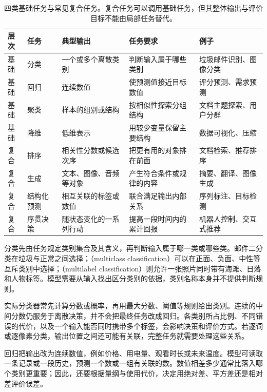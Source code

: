\begin{table}[t]
  \centering
  \small
  \begin{tabularx}{\linewidth}{@{}llXXX@{}}
    \toprule
    \textbf{层次} & \textbf{任务} & \textbf{典型输出} & \textbf{任务要求} & \textbf{例子} \\
    \midrule
    基础 & 分类 & 一个或多个离散类别 & 判断输入属于哪些类别 & 垃圾邮件识别、图像分类 \\
    基础 & 回归 & 连续数值 & 使预测值接近目标数值 & 评分预测、需求预测 \\
    基础 & 聚类 & 样本的组别或结构 & 按相似性探索分组结构 & 文档主题探索、用户分群 \\
    基础 & 降维 & 低维表示 & 用较少变量保留主要结构 & 数据可视化、压缩 \\
    复合 & 排序 & 相关性分数或候选次序 & 把更有用的对象排在前面 & 文档检索、推荐排序 \\
    复合 & 生成 & 文本、图像、音频等对象 & 产生符合条件或规律的内容 & 摘要、翻译、图像生成 \\
    复合 & 结构化预测 & 相互关联的标签或数值 & 联合满足输出内部关系 & 序列标注、目标检测 \\
    复合 & 序贯决策 & 随状态变化的一系列行动 & 提高一段时间内的累计回报 & 机器人控制、交互式推荐 \\
    \bottomrule
  \end{tabularx}
  \caption{四类基础任务与常见复合任务。复合任务可以调用基础任务，但其整体输出与评价目标不能由局部任务替代。}
  \label{tab:common-ml-tasks}
\end{table}

分类先由任务规定类别集合及其含义，再判断输入属于哪一类或哪些类。邮件二分类在垃圾与正常之间选择；（multiclass classification）可以在正面、负面、中性等互斥类别中选择；（multilabel classification）则允许一张照片同时带有海滩、日落和人物标签。模型需要从输入找出区分类别的依据，类别名称本身并不提供判断规则。

实际分类器常先计算分数或概率，再用最大分数、阈值等规则给出类别。连续的中间分数仍服务于离散决策，并不会把最终任务改成回归。各类别所占比例、不同错误的代价，以及一个输入能否同时携带多个标签，会影响决策和评价方式。若逐词或逐像素分类，输出位置之间还可能有关联，完整任务就需要处理这些关系。

回归把输出改为连续数值，例如价格、用电量、观看时长或未来温度。模型可读取一条记录或一段历史，预测一个数或一组有关联的数。数值相差多少通常比落入哪个类别更重要；因此，还要根据量纲与使用代价，决定用绝对差、平方差还是相对差评价误差。

